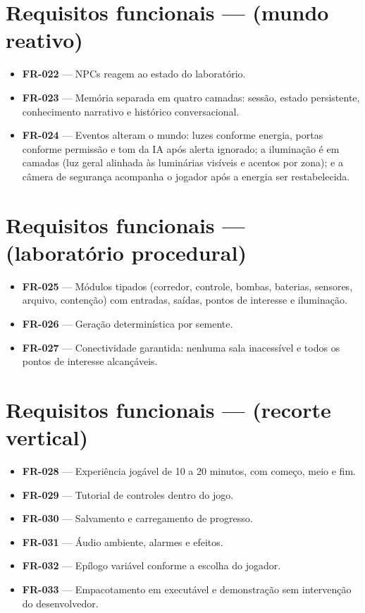\section*{Requisitos funcionais ---  (mundo reativo)}
\label{ap:fr4}
\begin{itemize}
  \item \textbf{FR-022} --- NPCs reagem ao estado do laboratório.
  \item \textbf{FR-023} --- Memória separada em quatro camadas: sessão, estado
  persistente, conhecimento narrativo e histórico conversacional.
  \item \textbf{FR-024} --- Eventos alteram o mundo: luzes conforme energia,
  portas conforme permissão e tom da IA após alerta ignorado; a iluminação é
  em camadas (luz geral alinhada às luminárias visíveis e acentos por zona); e
  a câmera de segurança acompanha o jogador após a energia ser restabelecida.
\end{itemize}

\section*{Requisitos funcionais ---  (laboratório procedural)}
\label{ap:fr5}
\begin{itemize}
  \item \textbf{FR-025} --- Módulos tipados (corredor, controle, bombas,
  baterias, sensores, arquivo, contenção) com entradas, saídas, pontos de
  interesse e iluminação.
  \item \textbf{FR-026} --- Geração determinística por semente.
  \item \textbf{FR-027} --- Conectividade garantida: nenhuma sala inacessível
  e todos os pontos de interesse alcançáveis.
\end{itemize}

\section*{Requisitos funcionais ---  (recorte vertical)}
\label{ap:fr6}
\begin{itemize}
  \item \textbf{FR-028} --- Experiência jogável de 10 a 20 minutos, com começo,
  meio e fim.
  \item \textbf{FR-029} --- Tutorial de controles dentro do jogo.
  \item \textbf{FR-030} --- Salvamento e carregamento de progresso.
  \item \textbf{FR-031} --- Áudio ambiente, alarmes e efeitos.
  \item \textbf{FR-032} --- Epílogo variável conforme a escolha do jogador.
  \item \textbf{FR-033} --- Empacotamento em executável e demonstração sem
  intervenção do desenvolvedor.
\end{itemize}

